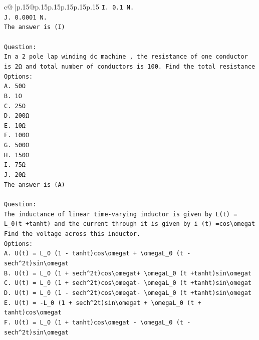 \documentclass{article}
\begin{document}
{\begin{supertabular}{c@{$\;$}|p{.15\linewidth}@{}p{.15\linewidth}p{.15\linewidth}p{.15\linewidth}p{.15\linewidth}p{.15\linewidth}}
{{{\texttt{I. 0.1 N.} \\
\texttt{J. 0.0001 N.} \\
\texttt{The answer is (I)} \\
\\ 
\texttt{Question:} \\
\texttt{In a 2 pole lap winding dc machine , the resistance of one conductor is 2Ω and total number of conductors is 100. Find the total resistance} \\
\texttt{Options:} \\
\texttt{A. 50Ω} \\
\texttt{B. 1Ω} \\
\texttt{C. 25Ω} \\
\texttt{D. 200Ω} \\
\texttt{E. 10Ω} \\
\texttt{F. 100Ω} \\
\texttt{G. 500Ω} \\
\texttt{H. 150Ω} \\
\texttt{I. 75Ω} \\
\texttt{J. 20Ω} \\
\texttt{The answer is (A)} \\
\\ 
\texttt{Question:} \\
\texttt{The inductance of linear time{-}varying inductor is given by L(t) = L\_0(t +tanht) and the current through it is given by i (t) =cos\textbackslash{}omegat Find the voltage across this inductor.} \\
\texttt{Options:} \\
\texttt{A. U(t) = L\_0 (1 {-} tanht)cos\textbackslash{}omegat + \textbackslash{}omegaL\_0 (t {-} sech\^{}2t)sin\textbackslash{}omegat} \\
\texttt{B. U(t) = L\_0 (1 + sech\^{}2t)cos\textbackslash{}omegat+ \textbackslash{}omegaL\_0 (t +tanht)sin\textbackslash{}omegat} \\
\texttt{C. U(t) = L\_0 (1 + sech\^{}2t)cos\textbackslash{}omegat{-} \textbackslash{}omegaL\_0 (t +tanht)sin\textbackslash{}omegat} \\
\texttt{D. U(t) = L\_0 (1 {-} sech\^{}2t)cos\textbackslash{}omegat{-} \textbackslash{}omegaL\_0 (t +tanht)sin\textbackslash{}omegat} \\
\texttt{E. U(t) = {-}L\_0 (1 + sech\^{}2t)sin\textbackslash{}omegat + \textbackslash{}omegaL\_0 (t + tanht)cos\textbackslash{}omegat} \\
\texttt{F. U(t) = L\_0 (1 + tanht)cos\textbackslash{}omegat {-} \textbackslash{}omegaL\_0 (t {-} sech\^{}2t)sin\textbackslash{}omegat} \\
}}}
\end{supertabular}}
\end{document}
